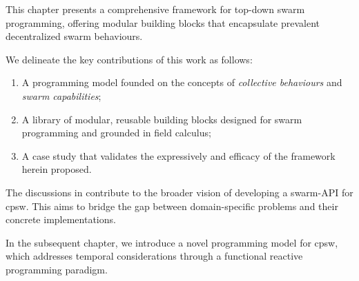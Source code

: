 This chapter presents a comprehensive framework for top-down swarm programming, 
 offering modular building blocks that encapsulate prevalent decentralized swarm behaviours. 

We delineate the key contributions of this work as follows:
\begin{enumerate}
  \item A programming model founded on the concepts of \emph{collective behaviours} and \emph{swarm capabilities};
  \item A library of modular, reusable building blocks designed for swarm programming and grounded in field calculus;
  \item A case study that validates the expressively and efficacy of the framework herein proposed.
\end{enumerate}

The discussions in  contribute to the broader vision of developing a swarm-API for \ac{cpsw}. This aims to bridge the gap between domain-specific problems and their concrete implementations.

In the subsequent chapter, we introduce a novel programming model for \ac{cpsw}, which addresses temporal considerations through a functional reactive programming paradigm.

